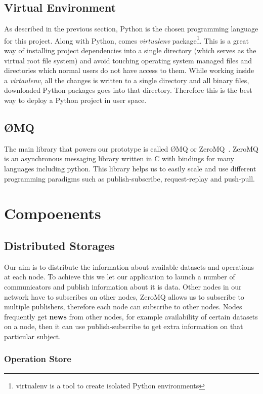 \subsection{Virtual Environment}
As described in the previous section, Python is the chosen programming language for this project. Along with Python, 
comes \textit{virtualenv} package\footnote{virtualenv is a tool to create isolated Python environments}. This is a great way of installing
project dependencies into a single directory (which serves as the virtual root file system) and avoid touching operating system managed files and
directories which normal users do not have access to them. While working inside a \textit{virtaulenv}, all the changes is written to a single directory
and all binary files, downloaded Python packages goes into that directory. Therefore this is the best way to deploy a Python project in user space.

\subsection{ØMQ}
The main library that powers our prototype is called ØMQ or ZeroMQ~\cite{ZeroMQ}.
ZeroMQ is an asynchronous messaging library written in C with 
bindings for many languages including python. This library helps us to easily scale and use 
different programming paradigms such as publish-subscribe, request-replay and push-pull.

\section{Compoenents}
\subsection{Distributed Storages}
Our aim is to distribute the information about available datasets and operations at each node. To achieve this
we let our application to launch a number of communicators and publish information about it is data.
Other nodes in our network have to subscribes on other nodes, ZeroMQ allows us to subscribe
to multiple publishers, therefore each node can subscribe to other nodes. Nodes frequently get
\textbf{news} from other nodes, for example availability of certain datasets on a node, then it
can use publish-subscribe to get extra information on that particular subject.
\subsubsection{Operation Store}
